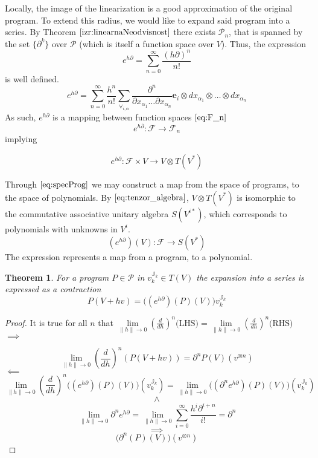 \documentclass{article}
\newcommand{\JJ}{\mathbb{J}}
\newcommand{\e}{\mathbf{e}}
\newcommand{\F}{\mathcal{F}}
\newcommand{\dP}{\mathcal{P}}
\newcommand{\D}{\partial}
\newtheorem{izrek}{Theorem}[section]
\begin{document}
 Locally, the image of the linearization is a good approximation of the original program. To extend this radius, we would like to expand said program into a series. By Theorem $\ref{izr:linearnaNeodvisnost}$  there exists $\dP_n$, that is spanned by the set $\{\D^k\}$ over $\dP$ (which is itself a function space over $V$). Thus, the expression
 \begin{equation}
 	e^{h\D}=\sum\limits_{n=0}^{\infty}\frac{(h\D)^n}{n!}
 \end{equation}
 is well defined.
 \begin{equation}\label{eq:e^d}
 	e^{h\D}=\sum\limits_{n=0}^{\infty}\frac{h^n}{n!}\sum_{\forall_{i,\alpha}}\frac{\partial^n}{\partial
 		    x_{\alpha_1}\ldots \partial x_{\alpha_n}}\e_i\otimes
 		  dx_{\alpha_1}\otimes\ldots \otimes dx_{\alpha_n}
 \end{equation}
As such, $e^{h\D}$ is a mapping between function spaces $\eqref{eq:F_n}$
 \begin{equation}
 	e^{h\D}:\F\to\F_n
 \end{equation}
 implying
  
  \begin{equation}\label{eq:specProg}
  	e^{h\D}:\F\times V\to V\otimes T(V^*)
  \end{equation}
  
Through $\eqref{eq:specProg}$ we may construct a map from the space of programs, to the space of polynomials. By $\eqref{eq:tenzor_algebra}$, $V\otimes T(V^*)$ is isomorphic to the commutative associative unitary algebra $S(V^{i*})$, which corresponds to polynomials with unknowns in $V^i$.
 \begin{equation}\label{eq:pToPol}
 	(e^{h\D})(V): \F\to S(V^*)
 \end{equation}
 The expression represents a map from a program, to a polynomial. 
 
\begin{izrek}\label{izr:e^d}
	For a program $P\in\dP$ in $v^{\JJ_k}_{k}\in T(V)$ the expansion into a series is expressed as a contraction\\
	\begin{equation}\label{eq:tenzorVrsta}
	P(V+hv) = \Big((e^{h\D})(P)(V)\Big)v^{\JJ_k}_{k}
	\end{equation}
\end{izrek}
 
 \begin{proof}
It is true for all $n$ that $\lim\limits_{\lVert h\rVert\to 0}(\frac{d}{dh})^n\text{(LHS)}=\lim\limits_{\lVert h\rVert\to 0}(\frac{d}{dh})^n\text{(RHS)}$\\
 $\implies$
 
 $$\lim\limits_{\lVert h\rVert\to 0}(\frac{d}{dh})^n(P(V+hv))=\D^n P(V)(v^{\otimes n})$$
 $\impliedby$
 $$\lim\limits_{\lVert h\rVert\to 0}(\frac{d}{dh})^n\Big((e^{h\D})(P)(V)\Big)(v^{\JJ_k}_{k})=\lim\limits_{\lVert h\rVert\to 0}\Big((\D^n e^{h\D})(P)(V)\Big)(v^{\JJ_k}_{k})$$
 $$\land$$
 $$\lim\limits_{\lVert h\rVert\to 0}\D^ne^{h\D}=\lim\limits_{\lVert h\rVert\to 0}\sum\limits_{i=0}^{\infty}\frac{h^i\D^{i+n}}{i!}=\D^n$$
 $$\implies$$
 $$\Big(\D^n(P)(V)\Big)(v^{\otimes n})$$
 \end{proof}
 
\end{document}
